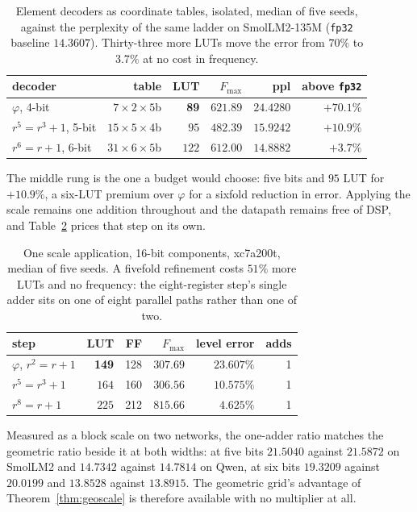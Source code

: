 \documentclass[11pt]{article}
\theoremstyle{definition}
\begin{document}
\begin{table}[t]\centering
\caption{Element decoders as coordinate tables, isolated, median of five seeds,
against the perplexity of the same ladder on SmolLM2-135M
(\texttt{fp32} baseline $14.3607$). Thirty-three more LUTs move the error from
$70\%$ to $3.7\%$ at no cost in frequency.}
\label{tab:elemsil}
\begin{tabular}{lrrrrr}
\toprule
decoder & table & LUT & $F_{\max}$ & ppl & above \texttt{fp32} \\
\midrule
$\varphi$, 4-bit          & $7\times2\times5$b  & \textbf{89} & $621.89$ & $24.4280$ & $+70.1\%$ \\
$r^5{=}r^3{+}1$, 5-bit    & $15\times5\times4$b & $95$ & $482.39$ & $15.9242$ & $+10.9\%$ \\
$r^6{=}r{+}1$, 6-bit      & $31\times6\times5$b & $122$ & $612.00$ & $\mathbf{14.8882}$ & $\mathbf{+3.7\%}$ \\
\bottomrule
\end{tabular}
\end{table}

The middle rung is the one a budget would choose: five bits and $95$ LUT for
$+10.9\%$, a six-LUT premium over $\varphi$ for a sixfold reduction in error.
Applying the scale remains one addition throughout and the datapath remains free
of DSP, and Table~\ref{tab:oneadder} prices that step on its own.

\begin{table}[t]\centering
\caption{One scale application, 16-bit components, xc7a200t, median of five
seeds. A fivefold refinement costs $51\%$ more LUTs and no frequency: the
eight-register step's single adder sits on one of eight parallel paths rather
than one of two.}
\label{tab:oneadder}
\begin{tabular}{lrrrrr}
\toprule
step & LUT & FF & $F_{\max}$ & level error & adds \\
\midrule
$\varphi$, $r^2=r+1$   & \textbf{149} & 128 & $307.69$ & $23.607\%$ & 1 \\
$r^5=r^3+1$            & $164$ & 160 & $306.56$ & $10.575\%$ & 1 \\
$r^8=r+1$              & $225$ & 212 & $\mathbf{815.66}$ & $\mathbf{4.625\%}$ & 1 \\
\bottomrule
\end{tabular}
\end{table}

Measured as a block scale on two networks, the one-adder ratio matches the
geometric ratio beside it at both widths: at five bits $21.5040$ against
$21.5872$ on SmolLM2 and $14.7342$ against $14.7814$ on Qwen, at six bits
$19.3209$ against $20.0199$ and $13.8528$ against $13.8915$. The geometric
grid's advantage of Theorem~\ref{thm:geoscale} is therefore available with no
multiplier at all.
\end{document}
